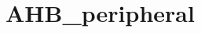 \hypertarget{group___a_h_b__peripheral}{\section{A\-H\-B\-\_\-peripheral}
\label{group___a_h_b__peripheral}
}
